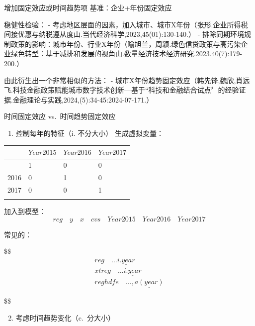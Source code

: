 \documentclass[
  ignorenonframetext,
  aspectratio=169,
  fontset=ubuntu]{ctexbeamer}
\providecommand{\tightlist}{%
  \setlength{\itemsep}{0pt}\setlength{\parskip}{0pt}}
\begin{document}
\begin{frame}[fragile]{增加固定效应或时间趋势项}
\label{ux589eux52a0ux56faux5b9aux6548ux5e94ux6216ux65f6ux95f4ux8d8bux52bfux9879}
基准：企业+年份固定效应

稳健性检验： -
考虑地区层面的因素，加入城市、城市X年份（张形.企业所得税间接优惠与纳税遵从度山.当代经济科学,2023,45(01):130-140.）
-
排除同期环境规制政策的影响：城市年份、行业X年份（喻旭兰，周颖.绿色信贷政策与高污染企
业绿色转型：基于减排和发展的视角山.数量经济技术经济研究.2023.40(7):179-200.）

由此衍生出一个非常相似的方法： -
城市X年份{趋势}固定效应（韩先锋,魏欣,肖远飞.科技金融政策赋能城市数字技术创新---基于``科技和金融结合试点〞的经验证据.金融理论与实践,2024,(5):34-45:2024-07-171.）

\begin{block}{时间固定效应 vs.~时间趋势固定效应}
\label{ux65f6ux95f4ux56faux5b9aux6548ux5e94-vs.-ux65f6ux95f4ux8d8bux52bfux56faux5b9aux6548ux5e94}
\begin{enumerate}
\tightlist
\item
  控制每年的特征（i. 不分大小） 生成虚拟变量：
\end{enumerate}

\begin{longtable}[]{@{}llll@{}}
\toprule\noalign{}
& \(Year2015\) & \(Year2016\) & \(Year2017\) \\
\midrule\noalign{}
\endhead
2015 & 1 & 0 & 0 \\
2016 & 0 & 1 & 0 \\
2017 & 0 & 0 & 1 \\
\bottomrule\noalign{}
\end{longtable}

加入到模型： \[
reg \quad y \quad x \quad cvs \quad Year2015 \quad Year2016 \quad Year2017
\]

常见的：

\$\$ \begin{align*}
reg \quad \dots \underline{i.year}  \\
xtreg \quad \dots \underline{i.year}  \\
reghdfe \quad \dots , \underline{a(year)}
\end{align*}

\$\$

\begin{enumerate}
\setcounter{enumi}{1}
\tightlist
\item
  考虑时间趋势变化（c.~分大小）
\end{enumerate}


\end{block}
\end{frame}
\end{document}
